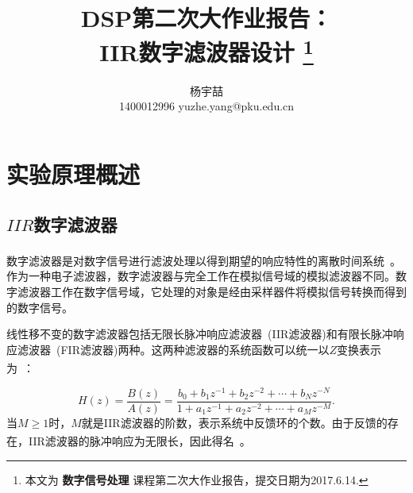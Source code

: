 \documentclass[a4paper,11pt,onecolumn,twoside]{article}
\title{\huge{DSP第二次大作业报告：\\IIR数字滤波器设计}
\thanks{本文为 \textbf{数字信号处理} 课程第二次大作业报告，提交日期为2017.6.14.}}
\author{杨宇喆 \\[2pt]
\normalsize
1400012996 \qquad yuzhe.yang@pku.edu.cn
\\[2pt]}
\date{}  %
\begin{document}
\newcommand{\supercite}[1]{\textsuperscript{\cite{#1}}}

\maketitle

\setlength{\oddsidemargin}{-.5cm}  %
\setlength{\evensidemargin}{\oddsidemargin}
\setlength{\textwidth}{17.00cm}

\section{实验原理概述}

\subsection{$IIR$数字滤波器}
数字滤波器是对数字信号进行滤波处理以得到期望的响应特性的离散时间系统~\supercite{wiki}。作为一种电子滤波器，数字滤波器与完全工作在模拟信号域的模拟滤波器不同。数字滤波器工作在数字信号域，它处理的对象是经由采样器件将模拟信号转换而得到的数字信号。

线性移不变的数字滤波器包括无限长脉冲响应滤波器~(IIR滤波器)和有限长脉冲响应滤波器~(FIR滤波器)两种。这两种滤波器的系统函数可以统一以$Z$变换表示为~\supercite{textbook}：

\begin{equation}
H(z) = \frac{B(z)}{A(z)} = \frac{b_0+b_1 z^{-1}+b_2 z^{-2}+\cdots +b_N z^{-N}}{1+a_1 z^{-1}+a_2 z^{-2}+\cdots +a_M z^{-M}}.
\end{equation}
当$M\geq 1$时，$M$就是IIR滤波器的阶数，表示系统中反馈环的个数。由于反馈的存在，IIR滤波器的脉冲响应为无限长，因此得名~\supercite{wikifft}。
\end{document}
